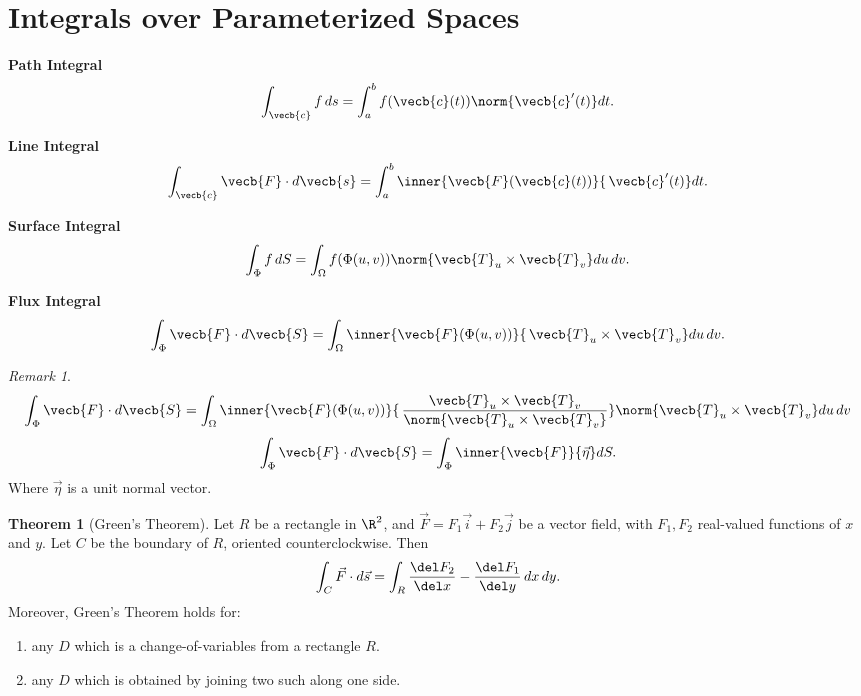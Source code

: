 \documentclass[a5paper]{article}
\theoremstyle{definition}%
\newtheorem*{theorem*}{Theorem} %
\numberwithin{exercise}{section}
\theoremstyle{remark}%
\newtheorem*{remark*}{Remark}
\begin{document}
\section{Integrals over Parameterized Spaces}

\begin{highlight}
\textbf{Path Integral}
$$\int_{\vecb{c}}f\, ds= \int_a^b f(\vecb{c}(t))\norm{\vecb{c}'(t)}dt.$$
\end{highlight}

\begin{highlight}
\textbf{Line Integral}
$$\int_{\vecb{c}}\vecb{F}\cdot d\vecb{s}= \int_a^b \inner{\vecb{F}(\vecb{c}(t))}{\,\vecb{c}'(t)} dt.$$
\end{highlight}

\begin{highlight}
\textbf{Surface Integral}
$$\int_{\Phi}f\, dS= \int_\Omega f(\Phi(u,v))\norm{\vecb{T}_u\times\vecb{T}_v}du\, dv.$$
\end{highlight}

\begin{highlight}
\textbf{Flux Integral}
$$\int_{\Phi}\vecb{F}\cdot d\vecb{S}= \int_\Omega \inner{\vecb{F}(\Phi(u,v))}{\,\vecb{T}_u\times\vecb{T}_v}du\, dv.$$
\end{highlight}

\begin{highlight}
\begin{remark*}
$$\int_{\Phi}\vecb{F}\cdot d\vecb{S} =  \int_\Omega \inner{\vecb{F}(\Phi(u,v))}{\,\frac{\vecb{T}_u\times\vecb{T}_v}{\norm{\vecb{T}_u\times\vecb{T}_v}}}\norm{\vecb{T}_u\times\vecb{T}_v}du\, dv$$
$$\int_{\Phi}\vecb{F}\cdot d\vecb{S} = \int_\Phi \inner{\vecb{F}}{\vec{\eta}}dS.$$
Where $\vec{\eta}$ is a unit normal vector.
\end{remark*}
\end{highlight}

\begin{highlight}
\begin{theorem*}[Green's Theorem]
Let $R$ be a rectangle in $\R^2$, and $\vec{F}=F_1\vec{i}+F_2\vec{j}$ be a vector field, with $F_1, F_2$ real-valued functions of $x$ and $y$. Let $C$ be the boundary of $R$, oriented counterclockwise. Then
$$\int_C \vec{F}\cdot d\vec{s}=\int_R \frac{\del F_2}{\del x}-\frac{\del F_1}{\del y}\, dx\, dy.$$
Moreover, Green's Theorem holds for:
\begin{enumerate}[label=(\alph*)]
\item any $D$ which is a change-of-variables from a rectangle $R$. 
\item any $D$ which is obtained by joining two such along one side. 
\end{enumerate}
\end{theorem*}
\end{highlight}
\end{document}
